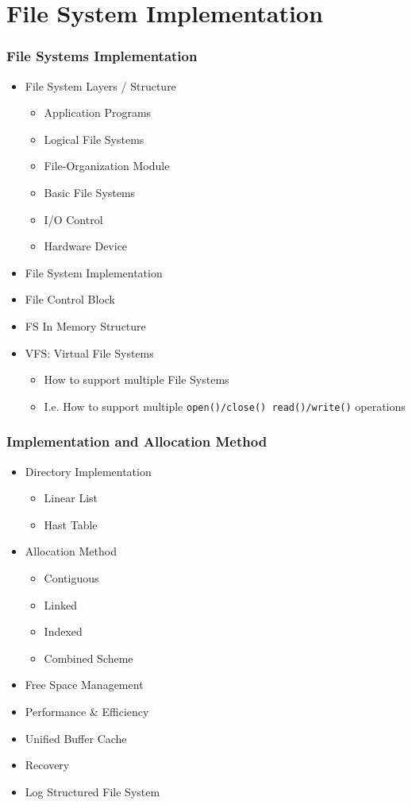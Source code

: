 \documentclass[aspectratio=169, xcolor=table, notheorems, hyperref={pdfpagelabels=false}]{beamer}
\begin{document}
\section{File System Implementation}
\begin{frame}[fragile]
\frametitle{File Systems Implementation}
\begin{itemize}
\item File System Layers / Structure
\begin{itemize}
\item Application Programs
\item Logical File Systems
\item File-Organization Module
\item Basic File Systems
\item I/O Control
\item Hardware Device
\end{itemize}
\item File System Implementation
\item File Control Block
\item FS In Memory Structure
\item VFS: Virtual File Systems
\begin{itemize}
\item How to support multiple File Systems
\item I.e. How to support multiple \texttt{open()/close() read()/write()} operations
\end{itemize}
\end{itemize}
\end{frame}

\begin{frame}[fragile]
\frametitle{Implementation and Allocation Method}
\begin{itemize}
\item Directory Implementation
\begin{itemize}
\item Linear List
\item Hast Table
\end{itemize}
\item {Allocation Method}
\begin{itemize}
\item Contiguous
\item Linked
\item Indexed
\item Combined Scheme
\end{itemize}
\item Free Space Management
\item Performance \& Efficiency
\item Unified Buffer Cache
\item Recovery
\item Log Structured File System
\end{itemize}
\end{frame}
\end{document}
